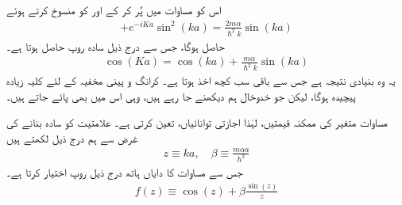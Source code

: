 اس کو مساوات  میں پُر کر کے اور  کو منسوخ کرتے ہوئے 
\begin{align*}
	[e^{iKa}-\cos(ka)][1-e^{-iKa}\cos(ka)] + e^{-iKa}\sin^{2}(ka) = \frac{2m\alpha}{\hslash^{2}k}\sin(ka)
\end{align*}
حاصل ہوگا، جس سے درج ذیل سادہ روپ حاصل ہوتا ہے۔
\begin{align}\label{مساوات_متماثل_سادہ_روپ_بلوخ}
	\cos(Ka) = \cos(ka) + \frac{m\alpha}{\hslash^{2}k}\sin(ka)
\end{align}
یہ وہ بنیادی نتیجہ ہے جس سے باقی سب کچھ اخذ ہوتا ہے۔ کرانگ و پینی مخفیہ کے لئے کلیہ زیادہ پیچیدہ ہوگا، لیکن جو خدوخال ہم دیکھنے جا رہے ہیں، وہی اس میں بھی پائے جاتے ہیں۔

 مساوات متغیر  کی ممکنہ قیمتیں، لہٰذا اجازتی توانائیاں، تعین کرتی ہے۔ علامتیت کو سادہ بنانے کی غرض سے ہم درج ذیل لکھتے ہیں 
\begin{align}
	z \equiv ka, \quad \beta \equiv \frac{m\alpha a}{\hslash^{2}}
\end{align}
جس سے مساوات  کا دایاں ہاتھ درج ذیل روپ اختیار کرتا ہے۔
\begin{align}\label{مساوات_متماثل_بے_بعدی_ناپ}
	f(z) \equiv \cos(z) + \beta\frac{\sin(z)}{z}
\end{align}

